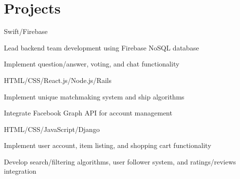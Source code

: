 \documentclass[]{deedy-resume}
\begin{document}
\begin{minipage}[t]{0.66\textwidth}

\section{Projects}

\begin{tightemize}
    \item Swift/Firebase
    \item Lead backend team development using Firebase NoSQL database
    \item Implement question/answer, voting, and chat functionality
\end{tightemize}
\sectionsep{}

\begin{tightemize}
  \item HTML/CSS/React.js/Node.js/Rails
  \item Implement unique matchmaking system and ship algorithms
  \item Integrate Facebook Graph API for account management
\end{tightemize}
\sectionsep{}

\begin{tightemize}
  \item HTML/CSS/JavaScript/Django
  \item Implement user account, item listing, and shopping cart functionality
  \item Develop search/filtering algorithms, user follower system, and ratings/reviews integration
\end{tightemize}
\sectionsep{}

\end{minipage}
\end{document}
